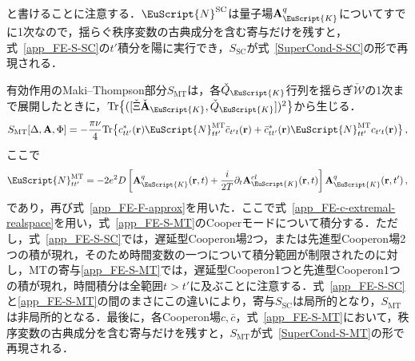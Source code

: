 \documentclass[a4paper,11pt]{ltjsarticle}
\def\Tr{\mathrm{Tr}}
\def\rt{(\mathbf{r},t)}
\begin{document}
と書けることに注意する．$\EuScript{N}^{\mathrm{SC}}$は量子場$\mathbf{A}^{q}_{\EuScript{K}}$についてすでに1次なので，揺らぐ秩序変数の古典成分を含む寄与だけを残すと，式~\eqref{app_FE-S-SC}の$t'$積分を陽に実行でき，$S_{\mathrm{SC}}$が式~\eqref{SuperCond-S-SC}の形で再現される．

有効作用のMaki--Thompson部分$S_{\mathrm{MT}}$は，各$\check{Q}_{\EuScript{K}}$行列を揺らぎ$\check{\mathcal{W}}$の1次まで展開したときに，$\Tr\big\{([\check{\Xi}\check{\mathbf{A}}_{\EuScript{K}},\check{Q}_{\EuScript{K}}])^{2}\big\}$から生じる．
\begin{equation}\label{app_FE-S-MT}
S_{\mathrm{MT}}[\Delta,\mathbf{A},\Phi]=-\frac{\pi\nu}{4}\Tr\big\{c^{*}_{tt'}(\mathbf{r})
\EuScript{N}^{\mathrm{MT}}_{tt'}\bar{c}_{t't}(\mathbf{r})+
\bar{c}^{*}_{tt'}(\mathbf{r})\EuScript{N}^{\mathrm{MT}}_{tt'}c_{t't}(\mathbf{r})\big\}\,,
\end{equation}
ここで
\begin{equation}\label{app_FE-N-MT}
\EuScript{N}^{\mathrm{MT}}_{tt'}=-2e^{2}D\left[\mathbf{A}^{q}_{\EuScript{K}}\rt+\frac{i}{2T}\partial_{t}
\mathbf{A}^{cl}_{\EuScript{K}}\rt\right]\mathbf{A}^{q}_{\EuScript{K}}(\mathbf{r},t')\,,
\end{equation}
であり，再び式~\eqref{app_FE-F-approx}を用いた．ここで式~\eqref{app_FE-c-extremal-realspace}を用い，式~\eqref{app_FE-S-MT}のCooperモードについて積分する．ただし，式~\eqref{app_FE-S-SC}では，遅延型Cooperon場2つ，または先進型Cooperon場2つの積が現れ，そのため時間変数の一つについて積分範囲が制限されたのに対し，MTの寄与\eqref{app_FE-S-MT}では，遅延型Cooperon1つと先進型Cooperon1つの積が現れ，時間積分は全範囲$t>t'$に及ぶことに注意する．式~\eqref{app_FE-S-SC}と\eqref{app_FE-S-MT}の間のまさにこの違いにより，寄与$S_{\mathrm{SC}}$は局所的となり，$S_{\mathrm{MT}}$は非局所的となる．最後に，各Cooperon場$c,\bar{c}$，式~\eqref{app_FE-S-MT}において，秩序変数の古典成分を含む寄与だけを残すと，$S_{\mathrm{MT}}$が式~\eqref{SuperCond-S-MT}の形で再現される．
\end{document}
